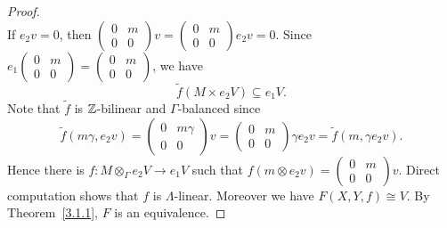 \begin{proof}
\[\]
If $e_2v=0$, then $(\begin{smallmatrix} 0 & m \\ 0 & 0 \end{smallmatrix}) v = (\begin{smallmatrix} 0 & m \\ 0 & 0 \end{smallmatrix}) e_2v = 0$. Since $e_1 (\begin{smallmatrix} 0 & m \\ 0 & 0 \end{smallmatrix})=(\begin{smallmatrix} 0 & m \\ 0 & 0 \end{smallmatrix})$, we have
\[
\widetilde{f}(M\times e_2V)\subseteq e_1V.
\]
Note that $\widetilde f$ is $\mathbb{Z}$-bilinear and $\Gamma$-balanced since
\[
\widetilde{f}(m\gamma,e_2v)
 = \begin{pmatrix} 0 & m\gamma \\ 0 & 0 \end{pmatrix} v
 = \begin{pmatrix} 0 & m \\ 0 & 0 \end{pmatrix} \gamma e_2v
 = \widetilde{f}(m,\gamma e_2v).
\]
Hence there is $f:M\otimes_\Gamma e_2V\to e_1V$ such that $f(m\otimes e_2v) = (\begin{smallmatrix} 0 & m \\ 0 & 0 \end{smallmatrix})v$. Direct computation shows that $f$ is $\Lambda$-linear. Moreover we have $F(X,Y,f)\cong V$. By Theorem~\ref{3.1.1}, $F$ is an equivalence.
\end{proof}


